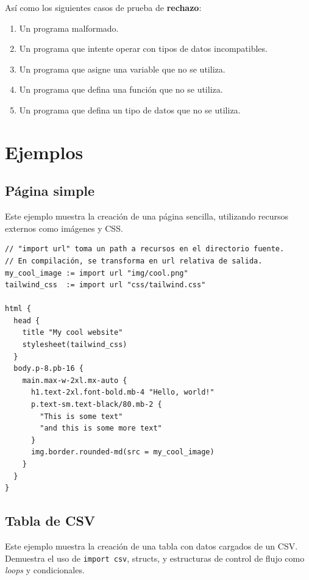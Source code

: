 Así como los siguientes casos de prueba de \textbf{rechazo}:

\begin{enumerate}
	\item Un programa malformado.
	\item Un programa que intente operar con tipos de datos incompatibles.
	\item Un programa que asigne una variable que no se utiliza.
	\item Un programa que defina una función que no se utiliza.
	\item Un programa que defina un tipo de datos que no se utiliza.
\end{enumerate}

\pagebreak
\section{Ejemplos}

\subsection{Página simple}

Este ejemplo muestra la creación de una página sencilla, utilizando recursos
externos como imágenes y CSS.

\scriptsize
\begin{verbatim}
// "import url" toma un path a recursos en el directorio fuente.
// En compilación, se transforma en url relativa de salida.
my_cool_image := import url "img/cool.png"
tailwind_css  := import url "css/tailwind.css"

html {
  head {
    title "My cool website"
    stylesheet(tailwind_css)
  }
  body.p-8.pb-16 {
    main.max-w-2xl.mx-auto {
      h1.text-2xl.font-bold.mb-4 "Hello, world!"
      p.text-sm.text-black/80.mb-2 {
        "This is some text"
        "and this is some more text"
      }
      img.border.rounded-md(src = my_cool_image)
    }
  }
}
\end{verbatim}
\normalsize

\pagebreak
\subsection{Tabla de CSV}

Este ejemplo muestra la creación de una tabla con datos cargados de un CSV.
Demuestra el uso de \texttt{import csv}, structs, y estructuras de control de
flujo como \textit{loops} y condicionales.

